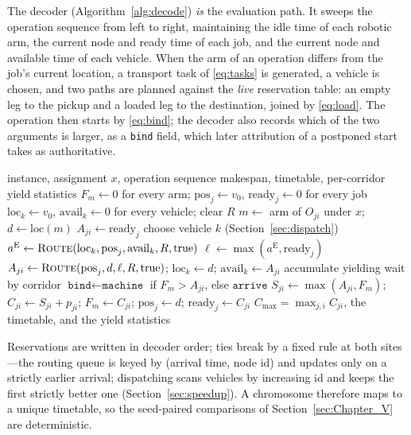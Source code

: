 \documentclass[manuscript,screen,review]{acmart}
\begin{document}
The decoder (Algorithm~\ref{alg:decode}) \emph{is} the evaluation path.
It sweeps the operation sequence from left to right, maintaining the idle time of each robotic arm, the current node and ready time of each job, and the current node and available time of each vehicle.
When the arm of an operation differs from the job's current location, a transport task of \eqref{eq:tasks} is generated, a vehicle is chosen, and two paths are planned against the \emph{live} reservation table: an empty leg to the pickup and a loaded leg to the destination, joined by \eqref{eq:load}.
The operation then starts by \eqref{eq:bind}; the decoder also records which of the two arguments is larger, as a \texttt{bind} field, which later attribution of a postponed start takes as authoritative.

\begin{algorithm}[t]
\caption{\textsc{Decode}: fitness from a complete conflict-free simulation}
\label{alg:decode}
\footnotesize
\begin{algorithmic}[1]
\Require instance, assignment $x$, operation sequence
\Ensure makespan, timetable, per-corridor yield statistics
\State $F_m\gets 0$ for every arm; $\mathrm{pos}_j\gets v_0$, $\mathrm{ready}_j\gets 0$ for every job
\State $\mathrm{loc}_k\gets v_0$, $\mathrm{avail}_k\gets 0$ for every vehicle; clear $R$
  \State $m\gets$ arm of $O_{ji}$ under $x$; $d\gets \mathrm{loc}(m)$
     \State $A_{ji}\gets \mathrm{ready}_j$
  \Else
     \State choose vehicle $k$ (Section~\ref{sec:dispatch})
     \State $a^{\mathrm{E}}\gets\textsc{Route}(\mathrm{loc}_k,\mathrm{pos}_j,\mathrm{avail}_k,R,\text{true})$
     \State $\ell\gets\max(a^{\mathrm{E}},\mathrm{ready}_j)$
     \State $A_{ji}\gets\textsc{Route}(\mathrm{pos}_j,d,\ell,R,\text{true})$; $\mathrm{loc}_k\gets d$; $\mathrm{avail}_k\gets A_{ji}$
     \State accumulate yielding wait by corridor
  \EndIf
  \State $\texttt{bind}\gets\texttt{machine}$ if $F_m>A_{ji}$, else $\texttt{arrive}$
  \State $S_{ji}\gets\max(A_{ji},F_m)$; $C_{ji}\gets S_{ji}+p_{ji}$; $F_m\gets C_{ji}$; $\mathrm{pos}_j\gets d$; $\mathrm{ready}_j\gets C_{ji}$
\EndFor
\State \Return $C_{\max}=\max_{j,i} C_{ji}$, the timetable, and the yield statistics
\end{algorithmic}
\end{algorithm}

Reservations are written in decoder order; ties break by a fixed rule at both sites---the routing queue is keyed by (arrival time, node id) and updates only on a strictly earlier arrival; dispatching scans vehicles by increasing id and keeps the first strictly better one (Section~\ref{sec:speedup}).
A chromosome therefore maps to a unique timetable, so the seed-paired comparisons of Section~\ref{sec:Chapter_V} are deterministic.
\end{document}
